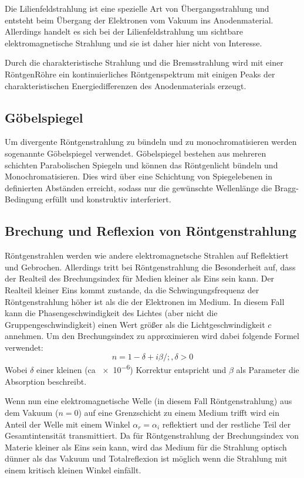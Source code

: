         Die Lilienfeldstrahlung ist eine spezielle Art von Übergangsstrahlung und entsteht beim Übergang der Elektronen vom Vakuum ins Anodenmaterial. Allerdings handelt es sich bei der Lilienfeldstrahlung um sichtbare elektromagnetische Strahlung und sie ist daher hier nicht von Interesse.

        Durch die charakteristische Strahlung und die Bremsstrahlung wird mit einer RöntgenRöhre ein kontinuierliches Röntgenspektrum mit einigen Peaks der charakteristischen Energiedifferenzen des Anodenmaterials erzeugt.
    \subsection{Göbelspiegel}
        Um divergente Röntgenstrahlung zu bündeln und zu monochromatisieren werden sogenannte Göbelspiegel verwendet.
        Göbelspiegel bestehen aus mehreren schichten Parabolischen Spiegeln und können das Röntgenlicht bündeln und Monochromatisieren.
        Dies wird über eine Schichtung von Spiegelebenen in definierten Abständen erreicht, sodass nur die gewünschte Wellenlänge die Bragg-Bedingung erfüllt und konstruktiv interferiert.
    \subsection{Brechung und Reflexion von Röntgenstrahlung}
        Röntgenstrahlen werden wie andere elektromagnetsche Strahlen auf Reflektiert und Gebrochen.
        Allerdings tritt bei Röntgenstrahlung die Besonderheit auf, dass der Realteil des Brechungsindex für Medien kleiner als Eins sein kann.
        Der Realteil kleiner Eins kommt zustande, da die Schwingungsfrequenz der Röntgenstrahlung höher ist als die der Elektronen im Medium.
        In diesem Fall kann die Phasengeschwindigkeit des Lichtes (aber nicht die Gruppengeschwindigkeit) einen Wert größer als die Lichtgeschwindigkeit $c$ annehmen.
        Um den Brechungsindex zu approximieren wird dabei folgende Formel verwendet:
        \begin{equation}
            n = 1-\delta+i\beta /; , \delta > 0
        \end{equation}
        Wobei $\delta$ einer kleinen (ca \num{e-6}) Korrektur entspricht und $\beta$ als Parameter die Absorption beschreibt.
        
        Wenn nun eine elektromagnetische Welle (in diesem Fall Röntgenstrahlung) aus dem Vakuum ($n = 0$) auf eine Grenzschicht zu einem Medium trifft wird ein Anteil der Welle mit einem Winkel $\alpha_r = \alpha_i$ reflektiert und der restliche Teil der Gesamtintensität transmittiert.
        Da für Röntgenstrahlung der Brechungsindex von Materie kleiner als Eins sein kann, wird das Medium für die Strahlung optisch dünner als das Vakuum und Totalreflexion ist möglich wenn die Strahlung mit einem kritisch kleinen Winkel einfällt.

